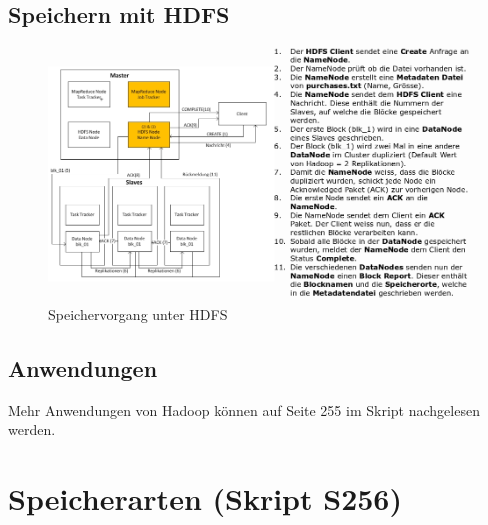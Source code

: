 \documentclass[a4paper, 11pt, nofootinbib]{article}
\begin{document}
\vspace{10px}


\subsection{Speichern mit HDFS}

\begin{figure}[htb]
	\centering
	\includegraphics[keepaspectratio=true,height=20\baselineskip]{hdfs_speichern.png}
	\caption{Speichervorgang unter HDFS}
\end{figure}

\subsection{Anwendungen}
Mehr Anwendungen von Hadoop können auf Seite 255 im Skript nachgelesen werden.

\newpage

\section{Speicherarten (Skript S256)}
\end{document}
